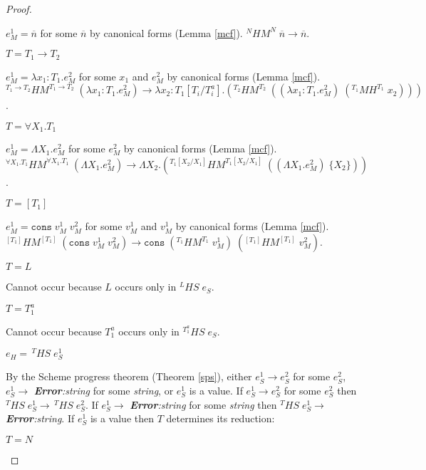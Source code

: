 \begin{theorem}
\begin{proof}
\begin{case}
\begin{case}
$e_{M}^{1}=\overline{n}$ for some $\overline{n}$ by canonical forms (Lemma \ref{mcf}).  $^{N}HM^{N}\;\overline{n}\rightarrow\overline{n}$.
\end{case}
\begin{case}
$T=T_{1}\rightarrow T_{2}$

$e_{M}^{1}=\lambda x_{1}:T_{1}.e_{M}^{2}$ for some $x_{1}$ and $e_{M}^{2}$ by canonical forms (Lemma \ref{mcf}).  $^{T_{1}\rightarrow T_{2}}HM^{T_{1}\rightarrow T_{2}}\;(\lambda x_{1}:T_{1}.e_{M}^{2})\rightarrow\lambda x_{2}:T_{1}[T_{i}/T^{a}_{i}].(^{T_{2}}HM^{T_{2}}\;((\lambda x_{1}:T_{1}.e_{M}^{2})\;(^{T_{1}}MH^{T_{1}}\;x_{2})))$.
\end{case}
\begin{case}
$T=\forall X_{1}.T_{1}$

$e_{M}^{1}=\Lambda X_{1}.e_{M}^{2}$ for some $e_{M}^{2}$ by canonical forms (Lemma \ref{mcf}).  $^{\forall X_{1}.T_{1}}HM^{\forall X_{1}.T_{1}}\;(\Lambda X_{1}.e_{M}^{2})\rightarrow\Lambda X_{2}.(^{T_{1}[X_{2}/X_{1}]}HM^{T_{1}[X_{2}/X_{1}]}\;((\Lambda X_{1}.e_{M}^{2})\;\lbrace X_{2}\rbrace))$.
\end{case}
\begin{case}
$T=[T_{1}]$

$e_{M}^{1}=\mathtt{cons}\;v_{M}^{1}\;v_{M}^{2}$ for some $v_{M}^{1}$ and $v_{M}^{1}$ by canonical forms (Lemma \ref{mcf}).  $^{[T_{1}]}HM^{[T_{1}]}\;(\mathtt{cons}\;v_{M}^{1}\;v_{M}^{2})\rightarrow\mathtt{cons}\;(^{T_{1}}HM^{T_{1}}\;v_{M}^{1})\;(^{[T_{1}]}HM^{[T_{1}]}\;v_{M}^{2})$.
\end{case}
\begin{case}
$T=L$

Cannot occur because $L$ occurs only in $^{L}HS\;e_{S}$.
\end{case}
\begin{case}
$T=T_{1}^{a}$

Cannot occur because $T_{1}^{a}$ occurs only in $^{T_{1}^{a}}HS\;e_{S}$.
\end{case}
\end{case}
\begin{case}
$e_{H}=\,^{T}HS\;e_{S}^{1}$

By the Scheme progress theorem (Theorem \ref{sps}), either $e_{S}^{1}\rightarrow e_{S}^{2}$ for some $e_{S}^{2}$, $e_{S}^{1}\rightarrow$ \emph{\textbf{Error}:\;string} for some \emph{string}, or $e_{S}^{1}$ is a value.  If $e_{S}^{1}\rightarrow e_{S}^{2}$ for some $e_{S}^{2}$ then $^{T}HS\;e_{S}^{1}\rightarrow\,^{T}HS\;e_{S}^{2}$.  If $e_{S}^{1}\rightarrow$ \emph{\textbf{Error}:\;string} for some \emph{string} then $^{T}HS\;e_{S}^{1}\rightarrow$ \emph{\textbf{Error}:\;string}.  If $e_{S}^{1}$ is a value then $T$ determines its reduction:
\begin{case}
$T=N$


\end{case}
\end{case}
\end{proof}
\end{theorem}
